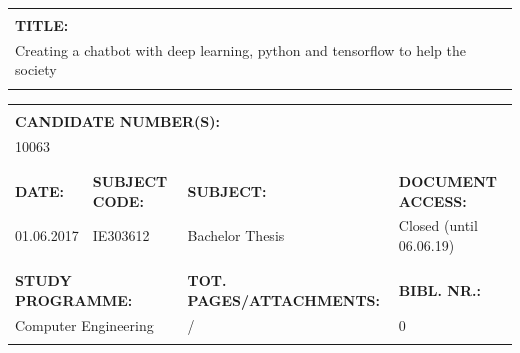 \documentclass[english, a4paper]{report}
\newcommand{\numitems}[1]{\getrefnumber{#1}}
\begin{document}
\raggedright

\glsaddall
{}

\begin{tabularx}{\textwidth}{|X|}
    \hline
    \\
    \textbf{TITLE:} \\
    Creating a chatbot with deep learning, python and tensorflow to help the society \\
    \\
    \hline
\end{tabularx}

\bigskip

\begin{tabularx}{\textwidth}{|X|X|X|X|}
    \hline
    \multicolumn{4}{|X|}{} \\
    \multicolumn{4}{|X|}{\textbf{CANDIDATE NUMBER(S): }} \\
    \multicolumn{4}{|X|}{10063} \\
    \multicolumn{4}{|X|}{} \\
    \hline
    \multicolumn{1}{|p{1.5cm}|}{} & \multicolumn{1}{|l|}{} & \multicolumn{1}{|p{3cm}|}{} & \multicolumn{1}{|l|}{}\\
    \multicolumn{1}{|p{1.5cm}|}{\textbf{DATE:}} & \multicolumn{1}{|l|}{\textbf{SUBJECT CODE:}} & \multicolumn{1}{|p{3cm}|}{\textbf{SUBJECT:}} & \multicolumn{1}{|l|}{\textbf{DOCUMENT ACCESS:}}\\
    \multicolumn{1}{|p{1.5cm}|}{01.06.2017} & \multicolumn{1}{|l|}{IE303612} & \multicolumn{1}{|p{3cm}|}{Bachelor Thesis} & \multicolumn{1}{|l|}{Closed (until 06.06.19)}\\
    \multicolumn{1}{|p{1.5cm}|}{} & \multicolumn{1}{|l|}{} & \multicolumn{1}{|p{3cm}|}{} & \multicolumn{1}{|l|}{}\\
    \hline
    \multicolumn{2}{|l|}{} & \multicolumn{1}{|l|}{} & \multicolumn{1}{|l|}{}\\
    \multicolumn{2}{|l|}{\textbf{STUDY PROGRAMME:}} & \multicolumn{1}{|l|}{\textbf{TOT. PAGES/ATTACHMENTS:}} & \multicolumn{1}{|l|}{\textbf{BIBL. NR.:}}\\
    \multicolumn{2}{|l|}{Computer Engineering} & \multicolumn{1}{|l|}{\pageref{attachments}/\numitems{nrOfAttachments}} & \multicolumn{1}{|l|}{0}\\
    \multicolumn{2}{|l|}{} & \multicolumn{1}{|l|}{} & \multicolumn{1}{|l|}{}\\
    \hline
\end{tabularx}
\end{document}
